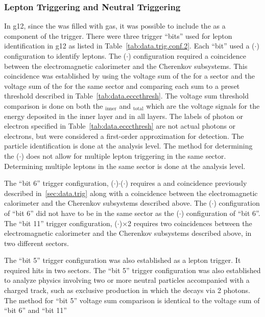 \subsubsection{Lepton Triggering and Neutral Triggering}\label{sec.data.trig.lepton}
In g12, since the  was filled with gas, it was possible to include the  as a component of the trigger. 
There were three trigger ``bits'' used for lepton identification in g12 as listed in Table~\ref{tab:data.trig.conf.2}. Each ``bit'' used a ($\cdot$) configuration to identify leptons. The ($\cdot$) configuration required a coincidence between the electromagnetic calorimeter and the Cherenkov subsystems. This coincidence was established by using the voltage sum of the  for a sector and the voltage sum of the  for the same sector and comparing each sum to a preset threshold described in Table~\ref{tab:data.ecccthresh}. The  voltage sum threshold comparison is done on both the $_\mathrm{inner}$ and $_{\mathrm{total}}$ which are the  voltage signals for the energy deposited in the inner layer and in all layers. The labels of photon or electron specified in Table~\ref{tab:data.ecccthresh} are not actual photons or electrons, but were considered a first-order approximation for detection. The particle identification is done at the analysis level. The method for determining the ($\cdot$) does not allow for multiple lepton triggering in the same sector. Determining multiple leptons in the same sector is done at the analysis level. 

The ``bit 6'' trigger configuration, ($\cdot$)$\cdot$($\cdot$) requires a  and  coincidence previously described in~\ref{sec:data.trig} along with a coincidence between the electromagnetic calorimeter and the Cherenkov subsystems described above. The ($\cdot$) configuration of ``bit 6'' did not have to be in the same sector as the ($\cdot$) configuration of ``bit 6''. The ``bit 11'' trigger configuration, ($\cdot$)$\times$2 requires two coincidences between the electromagnetic calorimeter and the Cherenkov subsystems described above, in two different sectors. 

The ``bit 5'' trigger configuration was also established as a lepton trigger. It required  hits in two sectors. The ``bit 5'' trigger configuration was also established to analyze physics involving two or more neutral particles accompanied with a charged track, such as exclusive \pizT production in which the \pizT decays via 2 photons. The method for ``bit 5'' voltage sum comparison is identical to the  voltage sum of ``bit 6'' and ``bit 11''

